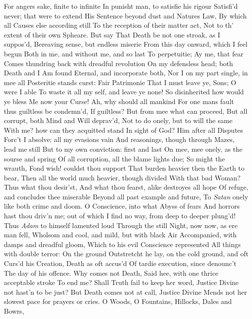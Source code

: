 \documentclass[11pt]{book}
\newcounter {first}
\newcounter {last}
\begin{document}
For angers sake, finite to infinite 
In punisht man, to satisfie his rigour 
Satisfi'd never; that were to extend 
His Sentence beyond dust and Natures Law, 
By which all Causes else according still 
To the reception of their matter act, 
Not to th' extent of their own Spheare.  But say 
That Death be not one stroak, as I suppos'd, 
Bereaving sense, but endless miserie 
From this day onward, which I feel begun 
Both in me, and without me, and so last 
To perpetuitie; Ay me, that fear 
Comes thundring back with dreadful revolution 
On my defensless head; both Death and I 
Am found Eternal, and incorporate both, 
Nor I on my part single, in mee all 
Posteritie stands curst: Fair Patrimonie 
That I must leave ye, Sons; O were I able 
To waste it all my self, and leave ye none! 
So disinherited how would ye bless 
Me now your Curse!  Ah, why should all mankind 
For one mans fault thus guiltless be condemn'd, 
If guiltless?  But from mee what can proceed, 
But all corrupt, both Mind and Will deprav'd, 
Not to do onely, but to will the same 
With me? how can they acquitted stand 
In sight of God?  Him after all Disputes 
Forc't I absolve: all my evasions vain 
And reasonings, though through Mazes, lead me still 
But to my own conviction: first and last 
On mee, mee onely, as the sourse and spring 
Of all corruption, all the blame lights due; 
So might the wrauth, Fond wish! couldst thou support 
That burden heavier then the Earth to bear, 
Then all the world much heavier, though divided 
With that bad Woman?  Thus what thou desir'st, 
And what thou fearst, alike destroyes all hope 
Of refuge, and concludes thee miserable 
Beyond all past example and future, 
To \textit{Satan} onely like both crime and doom. 
O Conscience, into what Abyss of fears 
And horrors hast thou driv'n me; out of which 
I find no way, from deep to deeper plung'd! 
\quad Thus \textit{Adam} to himself lamented loud 
Through the still Night, now now, as ere man fell, 
Wholsom and cool, and mild, but with black Air 
Accompanied, with damps and dreadful gloom, 
Which to his evil Conscience represented 
All things with double terror: On the ground 
Outstretcht he lay, on the cold ground, and oft 
Curs'd his Creation, Death as oft accus'd 
Of tardie execution, since denounc't 
The day of his offence.  Why comes not Death, 
Said hee, with one thrice acceptable stroke 
To end me?  Shall Truth fail to keep her word, 
Justice Divine not hast'n to be just? 
But Death comes not at call, Justice Divine 
Mends not her slowest pace for prayers or cries. 
O Woods, O Fountains, Hillocks, Dales and Bowrs, 
\end{document}

